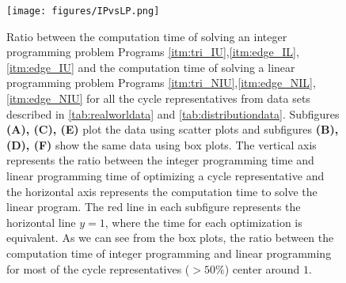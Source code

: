 \begin{figure}[h!]
\begin{center}
\texttt{[image: figures/IPvsLP.png]}%
\end{center}
 \caption{
 Ratio between the computation time of solving an integer programming problem Programs \ref{itm:tri_IU},\ref{itm:edge_IL}, \ref{itm:edge_IU} and the computation time of solving a linear programming problem Programs \ref{itm:tri_NIU},\ref{itm:edge_NIL}, \ref{itm:edge_NIU} for all the cycle representatives from data sets described in \se \ref{tab:realworldata} and \se \ref{tab:distributiondata}. Subfigures  \textbf{(A), (C), (E)} plot the data using scatter plots and subfigures  \textbf{(B), (D), (F)} show the same data using box plots. The vertical axis represents the ratio between the integer programming time and linear programming time of optimizing a cycle representative and the horizontal axis represents the computation time to solve the linear program. The red line in each subfigure represents the horizontal line $y=1$, where the time for each optimization is equivalent. As we can see from the box plots, the ratio between the computation time of integer programming and linear programming for most of the cycle representatives ($>50\%$) center around $1$.}\label{fig:lp_mip_ratio_df}
\end{figure}

